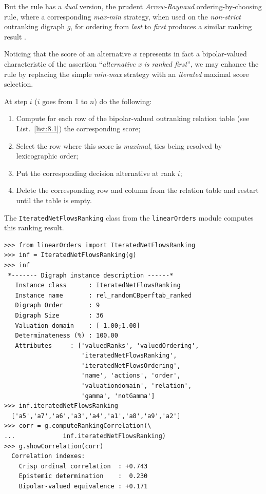 But the \Kohler rule has a \emph{dual} version, the prudent \emph{Arrow-Raynaud} ordering-by-choosing rule, where a corresponding \emph{max-min} strategy, when used on the \emph{non-strict} outranking digraph $g$, for ordering from \emph{last} to \emph{first} produces a similar ranking result \citep{ARR-1986}.

Noticing that the \NetFlows score of an alternative $x$ represents in fact a bipolar-valued characteristic of the assertion ``\emph{alternative x is ranked first}'', we may enhance the \Kohler rule by replacing the simple \emph{min-max} strategy with an \emph{iterated} maximal \NetFlows score selection.

\begin{definition}\label{def:8.5}
  
\noindent At step $i$ ($i$ goes from 1 to $n$) do the following:
\begin{enumerate}[leftmargin=0.5cm,rightmargin=0.5cm,topsep=1pt]
\item Compute for each row of the bipolar-valued outranking relation table (see List.~\vref{list:8.1}) the corresponding \NetFlows score;
\item Select the row where this score is \emph{maximal}, ties being resolved by lexicographic order;
\item Put the corresponding decision alternative at rank $i$;
\item Delete the corresponding row and column from the relation table and restart until the table is empty.
\end{enumerate}
\end{definition}

The \texttt{IteratedNetFlowsRanking} class from the \texttt{linearOrders} module computes this ranking result. 
\begin{lstlisting}[caption={Ranking-by-choosing with iterated maximal \NetFlows scores},label=list:8.15]   
>>> from linearOrders import IteratedNetFlowsRanking  
>>> inf = IteratedNetFlowsRanking(g)
>>> inf
 *------- Digraph instance description ------*
   Instance class      : IteratedNetFlowsRanking
   Instance name       : rel_randomCBperftab_ranked
   Digraph Order       : 9
   Digraph Size        : 36
   Valuation domain    : [-1.00;1.00]
   Determinateness (%) : 100.00
   Attributes     : ['valuedRanks', 'valuedOrdering',
                     'iteratedNetFlowsRanking',
                     'iteratedNetFlowsOrdering',
                     'name', 'actions', 'order',
                     'valuationdomain', 'relation',
                     'gamma', 'notGamma']
>>> inf.iteratedNetFlowsRanking
  ['a5','a7','a6','a3','a4','a1','a8','a9','a2']
>>> corr = g.computeRankingCorrelation(\
...             inf.iteratedNetFlowsRanking)
>>> g.showCorrelation(corr)
  Correlation indexes:
    Crisp ordinal correlation  : +0.743
    Epistemic determination    :  0.230
    Bipolar-valued equivalence : +0.171
\end{lstlisting}

